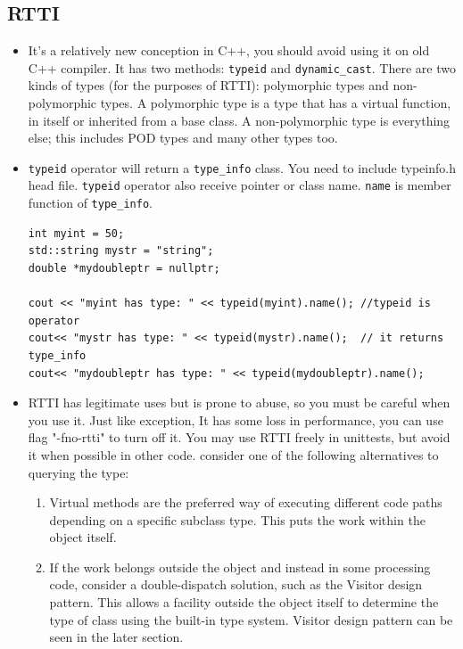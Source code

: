 \documentclass[a4paper,11pt,twoside]{book}
\begin{document}
\subsection{RTTI}
\begin{itemize}
	\item It's a relatively new conception in C++, you should avoid using it on old C++ compiler. It has two methods: \texttt{typeid} and \texttt{dynamic\_cast}. There are two kinds of types (for the purposes of RTTI): polymorphic types and non-polymorphic types. A polymorphic type is a type that has a virtual function, in itself or inherited from a base class. A non-polymorphic type is everything else; this includes POD types and many other types too.
	
	\item \texttt{typeid} operator will return a \texttt{type\_info} class.  You need to include typeinfo.h head file. \texttt{typeid} operator also receive pointer or class name. \texttt{name} is member function of \texttt{type\_info}.
	
\begin{lstlisting}
int myint = 50;
std::string mystr = "string";
double *mydoubleptr = nullptr;

cout << "myint has type: " << typeid(myint).name(); //typeid is operator
cout<< "mystr has type: " << typeid(mystr).name();  // it returns type_info
cout<< "mydoubleptr has type: " << typeid(mydoubleptr).name(); 	
\end{lstlisting}	
	
	\item RTTI has legitimate uses but is prone to abuse, so you must be careful when you use it. Just like exception, It has some loss in performance, you can use flag "-fno-rtti" to turn off it. You may use RTTI freely in unittests, but avoid it when possible in other code. consider one of the following alternatives to querying the type:
	\begin{enumerate}
		\item Virtual methods are the preferred way of executing different code paths depending on a specific subclass type. This puts the work within the object itself.
		
		\item If the work belongs outside the object and instead in some processing code, consider a double-dispatch solution, such as the Visitor design pattern. This allows a facility outside the object itself to determine the type of class using the built-in type system. Visitor design pattern can be seen in the later section.
	\end{enumerate}
\end{itemize}
\end{document}
